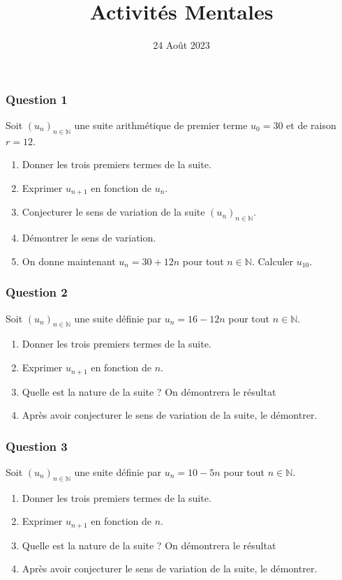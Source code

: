 \documentclass[15pt, mathserif]{beamer}
\title{Activités Mentales}
\date{24 Août 2023}
\newcommand{\N}{\mathbb{N}}			%
\newcommand{\st}[1]{$(#1_n)_{n \in \N}$}
\begin{document}
\begin{frame}
    \titlepage
\end{frame}

\begin{frame} 
	\frametitle{Question 1}
Soit \st{u} une suite arithmétique de premier terme $u_0=30$ et de raison $r=12$. 
 
 \begin{enumerate} 
 	 \item Donner les trois premiers termes de la suite. 
 	 \item Exprimer $u_{n+1}$ en fonction de $u_n$. 
 	 \item Conjecturer le sens de variation de la suite \st{u}. 
 	 \item Démontrer le sens de variation. 
 	 \item On donne maintenant $u_n=30+12n$ pour tout $n \in \N$. Calculer $u_{10}$. 
 
 \end{enumerate} \end{frame}


\begin{frame} 
	\frametitle{Question 2}
Soit \st{u} une suite définie par $u_n=16-12n$ pour tout $n \in \N$. 
 
 \begin{enumerate} 
 	 \item Donner les trois premiers termes de la suite. 
 	 \item Exprimer $u_{n+1}$ en fonction de $n$. 
 	 \item Quelle est la nature de la suite ? On démontrera le résultat 
 	 \item Après avoir conjecturer le sens de variation de la suite, le démontrer. 
 
 \end{enumerate} \end{frame}


\begin{frame} 
	\frametitle{Question 3}
Soit \st{u} une suite définie par $u_n=10-5n$ pour tout $n \in \N$. 
 
 \begin{enumerate} 
 	 \item Donner les trois premiers termes de la suite. 
 	 \item Exprimer $u_{n+1}$ en fonction de $n$. 
 	 \item Quelle est la nature de la suite ? On démontrera le résultat 
 	 \item Après avoir conjecturer le sens de variation de la suite, le démontrer. 
 
 \end{enumerate} \end{frame}
\end{document}
